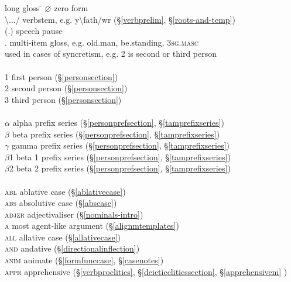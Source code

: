 \begin{tabbing}
	long gloss \= \kill
	\textsc{$\varnothing$} \> zero form\\
	{\textbackslash.../} \> {verbstem, e.g. y\textbackslash fath/wr (\S\ref{verbprelim}, \S\ref{roots-and-temp})}\\
	{(.)} \> {speech pause}\\
	{.} \> {multi-item gloss, e.g. old.man, be.standing, \textsc{3sg.masc}}\\
	{\textbar} \> {used in cases of syncretism, e.g. 2 is second or third person}\\\\
	\textsc{1} \> {first person (\S\ref{personsection})}\\
	\textsc{2} \> {second person (\S\ref{personsection})}\\
	\textsc{3} \> {third person (\S\ref{personsection})}\\\\
	\textsc{$\alpha{}$} \> {alpha prefix series (\S\ref{personprefsection}, \S\ref{tamprefixseries})}\\
	\textsc{$\beta{}$} \> {beta prefix series (\S\ref{personprefsection}, \S\ref{tamprefixseries})}\\
	\textsc{$\gamma{}$} \> {gamma prefix series (\S\ref{personprefsection}, \S\ref{tamprefixseries})}\\
	\textsc{$\beta{}$1} \> {beta 1 prefix series (\S\ref{personprefsection}, \S\ref{tamprefixseries})}\\
	\textsc{$\beta{}$2} \> {beta 2 prefix series (\S\ref{personprefsection}, \S\ref{tamprefixseries})}\\\\
	\textsc{abl} \> {ablative case (\S\ref{ablativecase})}\\
	\textsc{abs} \> {absolutive case (\S\ref{abscase})}\\
	\textsc{adjzr} \> {adjectivaliser (\S\ref{nominals-intro})}\\
	\textsc{a} \> {most agent-like argument (\S\ref{alignmtemplates})}\\
	\textsc{all} \> {allative case (\S\ref{allativecase})}\\
	\textsc{and} \> {andative (\S\ref{directionalinflection})}\\
	\textsc{anim} \> {animate (\S\ref{formfunccase}, \S\ref{casenotes})}\\
	\textsc{appr} \> {apprehensive (\S\ref{verbproclitics}, \S\ref{deicticcliticssection}, \S\ref{apprehensivem} )}\\

\end{tabbing}
